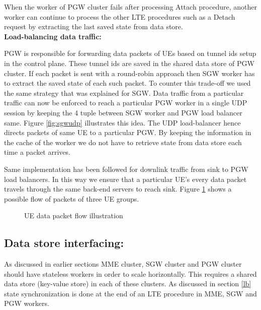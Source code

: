 \documentclass[hidelinks]{report}
\begin{document}
\par When the worker of PGW cluster fails after processing Attach procedure, another worker can continue to process the other LTE procedures such as a Detach request by extracting the last saved state from data store.\\

\textbf{Load-balancing data traffic:}

PGW is responsible for forwarding data packets of UEs based on tunnel ids setup in the control plane. These tunnel ids are saved in the shared data store of PGW cluster. If each packet is sent with a round-robin approach then SGW worker has to extract the saved state of each such packet. To counter this trade-off we used the same strategy that was explained for SGW. Data traffic from a particular traffic can now be enforced to reach a particular PGW worker in a single UDP session by keeping the 4 tuple between SGW worker and PGW load balancer same. Figure \ref{fig:sgwudp} illustrates this idea. The UDP load-balancer hence directs packets of same UE to a particular PGW. By keeping the information in the cache of the worker we do not have to retrieve state from data store each time a packet arrives.

\par Same implementation has been followed for downlink traffic from sink to PGW load balancers. In this way we ensure that a particular UE's every data packet travels through the same back-end servers to reach sink. Figure \ref{fig:dpath} shows a possible flow of packets of three UE groups.
\begin{figure}[H]
\centering
{}
\caption{UE data packet flow illustration}
\label{fig:dpath}
\end{figure}

\subsection*{Data store interfacing:}

As discussed in earlier sections MME cluster, SGW cluster and PGW cluster should have stateless workers in order to scale horizontally. This requires a shared data store (key-value store) in each of these clusters. As discussed in section \ref{lb} state synchronization is done at the end of an LTE procedure in MME, SGW and PGW workers.
\end{document}
